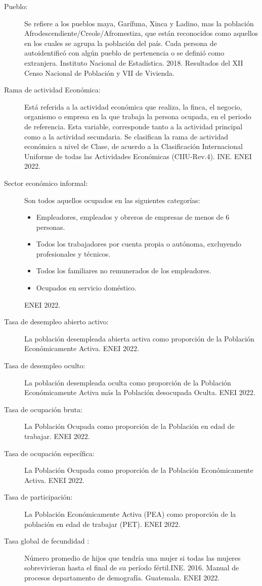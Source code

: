 \begin{description}
	\item[Pueblo:] Se refiere a los pueblos maya, Garífuna, Xinca y Ladino, mas la población Afrodescendiente/Creole/Afromestiza, que están reconocidos como aquellos en los cuales se agrupa la población del país. Cada persona de autoidentificó con algún pueblo de pertenencia o se definió como extranjera. Instituto Nacional de Estadística. 2018. Resultados del XII Censo Nacional de Población y VII de Vivienda.
	\item[Rama de actividad Económica:] Está referida a la actividad económica que realiza, la finca, el negocio, organismo o empresa en la que trabaja la persona ocupada, en el periodo de referencia. Esta variable, corresponde tanto a la actividad principal como a la actividad secundaria. Se clasifican la rama de actividad económica a nivel de Clase, de acuerdo a la Clasificación Internacional Uniforme de todas las Actividades Económicas (CIIU-Rev.4). INE. ENEI 2022. 
	\item[Sector económico informal:] Son todos aquellos ocupados en las siguientes categorías:
	\begin{itemize}\itemsep -1pt
		\item	Empleadores, empleados y obreros de empresas de menos de 6 personas.
		\item	Todos los trabajadores por cuenta propia o autónoma, excluyendo profesionales y técnicos. 
		\item	Todos los familiares no remunerados de los empleadores.
		\item	Ocupados en servicio doméstico.
	\end{itemize}
	ENEI 2022.
	\item[Tasa de desempleo abierto activo:] La población desempleada abierta activa como proporción de la Población Económicamente Activa. ENEI 2022.
	\item[Tasa de desempleo oculto:] La población desempleada oculta como proporción de la Población Económicamente Activa más la Población desocupada Oculta. ENEI 2022.
	\item[Tasa de ocupación bruta:] La Población Ocupada como proporción de la Población en edad de trabajar. ENEI 2022.
	\item[Tasa de ocupación específica:] La Población Ocupada como proporción de la Población Económicamente Activa. ENEI 2022.
	\item[Tasa de participación:] La Población Económicamente Activa (PEA) como proporción de la población en edad de trabajar (PET). ENEI 2022.
	\item[Tasa global de fecundidad :] Número promedio de hijos que tendría una mujer si todas las mujeres sobrevivieran hasta el final de su período fértil.INE. 2016. Manual de procesos departamento de demografía. Guatemala. ENEI 2022.

\end{description}
